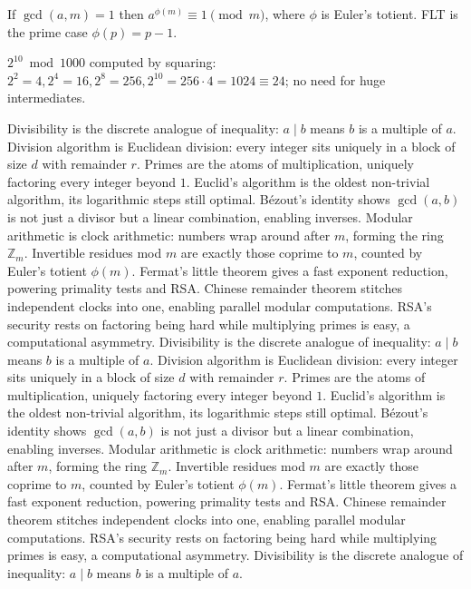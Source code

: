 \begin{theorem}
If $\gcd(a,m)=1$ then $a^{\phi(m)}\equiv1\pmod m$, where $\phi$ is Euler's totient. FLT is the prime case $\phi(p)=p-1$.
\end{theorem}

\begin{example}
$2^{10}\bmod1000$ computed by squaring: $2^2=4,2^4=16,2^8=256,2^{10}=256\cdot4=1024\equiv24$; no need for huge intermediates.
\end{example}

Divisibility is the discrete analogue of inequality: $a\mid b$ means $b$ is a multiple of $a$.
Division algorithm is Euclidean division: every integer sits uniquely in a block of size $d$ with remainder $r$.
Primes are the atoms of multiplication, uniquely factoring every integer beyond $1$.
Euclid's algorithm is the oldest non-trivial algorithm, its logarithmic steps still optimal.
B\'ezout's identity shows $\gcd(a,b)$ is not just a divisor but a linear combination, enabling inverses.
Modular arithmetic is clock arithmetic: numbers wrap around after $m$, forming the ring $\mathbb{Z}_m$.
Invertible residues mod $m$ are exactly those coprime to $m$, counted by Euler's totient $\phi(m)$.
Fermat's little theorem gives a fast exponent reduction, powering primality tests and RSA.
Chinese remainder theorem stitches independent clocks into one, enabling parallel modular computations.
RSA's security rests on factoring being hard while multiplying primes is easy, a computational asymmetry.
Divisibility is the discrete analogue of inequality: $a\mid b$ means $b$ is a multiple of $a$.
Division algorithm is Euclidean division: every integer sits uniquely in a block of size $d$ with remainder $r$.
Primes are the atoms of multiplication, uniquely factoring every integer beyond $1$.
Euclid's algorithm is the oldest non-trivial algorithm, its logarithmic steps still optimal.
B\'ezout's identity shows $\gcd(a,b)$ is not just a divisor but a linear combination, enabling inverses.
Modular arithmetic is clock arithmetic: numbers wrap around after $m$, forming the ring $\mathbb{Z}_m$.
Invertible residues mod $m$ are exactly those coprime to $m$, counted by Euler's totient $\phi(m)$.
Fermat's little theorem gives a fast exponent reduction, powering primality tests and RSA.
Chinese remainder theorem stitches independent clocks into one, enabling parallel modular computations.
RSA's security rests on factoring being hard while multiplying primes is easy, a computational asymmetry.
Divisibility is the discrete analogue of inequality: $a\mid b$ means $b$ is a multiple of $a$.
